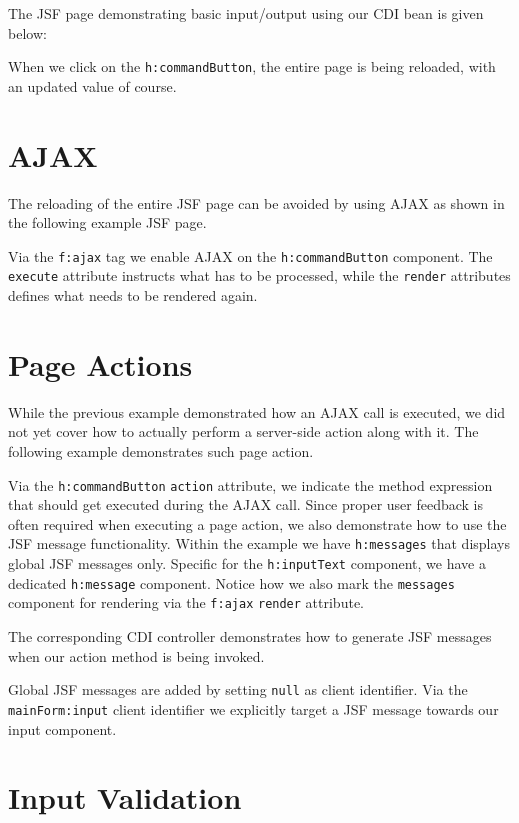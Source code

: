 The JSF page demonstrating basic input/output using our CDI bean is given below:

When we click on the \texttt{h:commandButton}, the entire page is being reloaded, with an updated value of course.


\section{AJAX}

The reloading of the entire JSF page can be avoided by using AJAX as shown in the following example JSF page.

Via the \texttt{f:ajax} tag we enable AJAX on the \texttt{h:commandButton} component.
The \texttt{execute} attribute instructs what has to be processed, while the \texttt{render} attributes defines what needs to be rendered again.


\section{Page Actions}
While the previous example demonstrated how an AJAX call is executed, we did not yet cover how to actually perform a server-side action along with it.
The following example demonstrates such page action.

Via the \texttt{h:commandButton} \texttt{action} attribute, we indicate the method expression that should get executed during the AJAX call.
Since proper user feedback is often required when executing a page action, we also demonstrate how to use the JSF message functionality.
Within the example we have \texttt{h:messages} that displays global JSF messages only.
Specific for the \texttt{h:inputText} component, we have a dedicated \texttt{h:message} component.
Notice how we also mark the \texttt{messages} component for rendering via the \texttt{f:ajax} \texttt{render} attribute.

The corresponding CDI controller demonstrates how to generate JSF messages when our action method is being invoked.

Global JSF messages are added by setting \texttt{null} as client identifier.
Via the \texttt{mainForm:input} client identifier we explicitly target a JSF message towards our input component.

\section{Input Validation}

